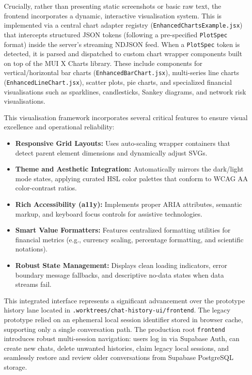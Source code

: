 \documentclass[11pt]{article}
\begin{document}
Crucially, rather than presenting static screenshots or basic raw text, the frontend incorporates a dynamic, interactive visualisation system. This is implemented via a central chart adapter registry (\texttt{EnhancedChartsExample.jsx}) that intercepts structured JSON tokens (following a pre-specified \texttt{PlotSpec} format) inside the server's streaming NDJSON feed. When a \texttt{PlotSpec} token is detected, it is parsed and dispatched to custom chart wrapper components built on top of the MUI X Charts library. These include components for vertical/horizontal bar charts (\texttt{EnhancedBarChart.jsx}), multi-series line charts (\texttt{EnhancedLineChart.jsx}), scatter plots, pie charts, and specialized financial visualisations such as sparklines, candlesticks, Sankey diagrams, and network risk visualisations.

This visualisation framework incorporates several critical features to ensure visual excellence and operational reliability:
\begin{itemize}
    \item \textbf{Responsive Grid Layouts:} Uses auto-scaling wrapper containers that detect parent element dimensions and dynamically adjust SVGs.
    \item \textbf{Theme and Aesthetic Integration:} Automatically mirrors the dark/light mode states, applying curated HSL color palettes that conform to WCAG AA color-contrast ratios.
    \item \textbf{Rich Accessibility (a11y):} Implements proper ARIA attributes, semantic markup, and keyboard focus controls for assistive technologies.
    \item \textbf{Smart Value Formatters:} Features centralized formatting utilities for financial metrics (e.g., currency scaling, percentage formatting, and scientific notations).
    \item \textbf{Robust State Management:} Displays clean loading indicators, error boundary message fallbacks, and descriptive no-data states when data streams fail.
\end{itemize}

This integrated interface represents a significant advancement over the prototype history lane located in \texttt{.worktrees/chat-history-ui/frontend}. The legacy prototype relied on an ephemeral local session identifier stored in browser cache, supporting only a single conversation path. The production root \texttt{frontend} introduces robust multi-session navigation: users log in via Supabase Auth, can create new chats, delete unwanted histories, claim legacy local sessions, and seamlessly restore and review older conversations from Supabase PostgreSQL storage.
\end{document}
